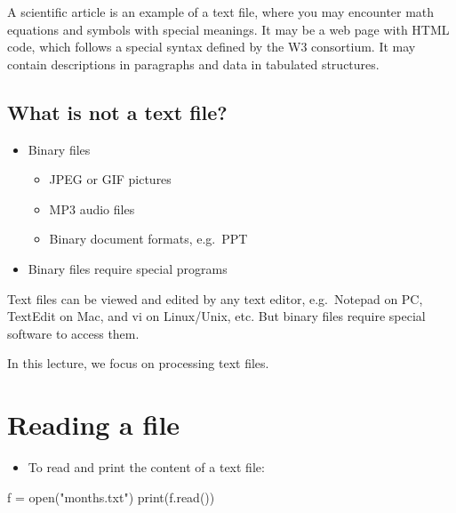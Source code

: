 \documentclass[
  letterpaper,
]{scrbook}
\newenvironment{Shaded}{\begin{snugshade}}{\end{snugshade}}
\newcommand{\BuiltInTok}[1]{\textcolor[rgb]{0.00,0.23,0.31}{#1}}
\newcommand{\NormalTok}[1]{\textcolor[rgb]{0.00,0.23,0.31}{#1}}
\newcommand{\OperatorTok}[1]{\textcolor[rgb]{0.37,0.37,0.37}{#1}}
\newcommand{\StringTok}[1]{\textcolor[rgb]{0.13,0.47,0.30}{#1}}
\providecommand{\tightlist}{%
  \setlength{\itemsep}{0pt}\setlength{\parskip}{0pt}}
\begin{document}
A scientific article is an example of a text file, where you may
encounter math equations and symbols with special meanings. It may be a
web page with HTML code, which follows a special syntax defined by the
W3 consortium. It may contain descriptions in paragraphs and data in
tabulated structures.

\subsection*{What is not a text file?}\label{what-is-not-a-text-file}

\begin{itemize}
\tightlist
\item
  Binary files

  \begin{itemize}
  \tightlist
  \item
    JPEG or GIF pictures
  \item
    MP3 audio files
  \item
    Binary document formats, e.g.~PPT
  \end{itemize}
\item
  Binary files require special programs
\end{itemize}

Text files can be viewed and edited by any text editor, e.g.~Notepad on
PC, TextEdit on Mac, and vi on Linux/Unix, etc. But binary files require
special software to access them.

In this lecture, we focus on processing text files.

\section*{Reading a file}\label{reading-a-file}


\begin{itemize}
\tightlist
\item
  To read and print the content of a text file:
\end{itemize}

\begin{Shaded}
\begin{Highlighting}[]
\NormalTok{f }\OperatorTok{=} \BuiltInTok{open}\NormalTok{(}\StringTok{"months.txt"}\NormalTok{)}
\BuiltInTok{print}\NormalTok{(f.read())}
\end{Highlighting}
\end{Shaded}
\end{document}
